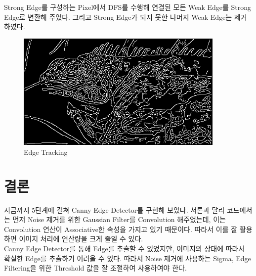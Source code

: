 \documentclass[]{report}
\begin{document}
Strong Edge를 구성하는 Pixel에서 DFS를 수행해 연결된 모든 Weak Edge를 Strong Edge로 변환해 주었다. 그리고 Strong Edge가 되지 못한 나머지 Weak Edge는 제거하였다. \\

\begin{figure}[ht!]
	\centering
	\includegraphics[width=0.9\textwidth]{image/problem5.png}
	\caption{Edge Tracking}
	\label{problem5}
\end{figure}

\chapter{결론}

지금까지 5단계에 걸쳐 Canny Edge Detector를 구현해 보았다. 서론과 달리 코드에서는 먼저 Noise 제거를 위한 Gaussian Filter를 Convolution 해주었는데, 이는 Convolution 연산이 Associative한 속성을 가지고 있기 때문이다. 따라서 이를 잘 활용하면 이미지 처리에 연산량을 크게 줄일 수 있다. \\

Canny Edge Detector를 통해 Edge를 추출할 수 있었지만, 이미지의 상태에 따라서 확실한 Edge를 추출하기 어려울 수 있다. 따라서 Noise 제거에 사용하는 Sigma, Edge Filtering을 위한 Threshold 값을 잘 조절하여 사용하여야 한다. \\ 
\end{document}
